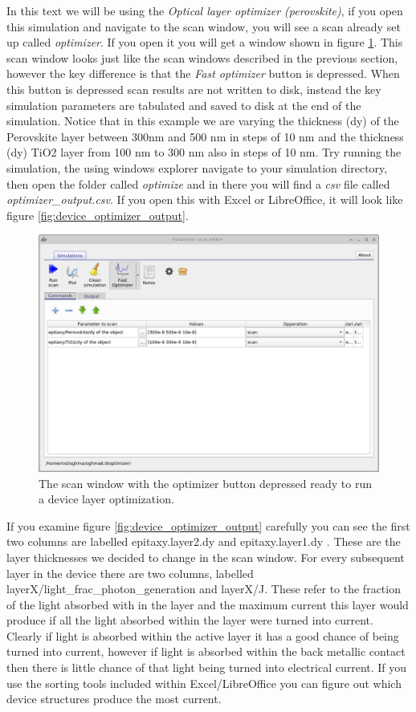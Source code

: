 In this text we will be using the \emph{Optical layer optimizer (perovskite)}, if you open this simulation and navigate to the scan window, you will see a scan already set up called \emph{optimizer}. If you open it you will get a window shown in figure \ref{fig:device_optimizer}. This scan window looks just like the scan windows described in the previous section, however the key difference is that the \emph{Fast optimizer} button is depressed. When this button is depressed scan results are not written to disk, instead the key simulation parameters are tabulated and saved to disk at the end of the simulation.  Notice that in this example we are varying the thickness (dy) of the Perovskite layer between 300nm and 500 nm in steps of 10 nm and the thickness (dy) TiO2 layer from 100 nm to 300 nm also in steps of 10 nm. Try running the simulation, the using windows explorer navigate to your simulation directory, then open the folder called \emph{optimize} and in there you will find a \emph{csv} file called \emph{optimizer\_output.csv}. If you open this with Excel or LibreOffice, it will look like figure \ref{fig:device_optimizer_output}.

\begin{figure}
\centering
\includegraphics[width=0.6\linewidth,height=0.5\linewidth]{./images/scan_optimizer.png}
\caption{The scan window with the optimizer button depressed ready to run a device layer optimization.}
\label{fig:device_optimizer}
\end{figure}

If you examine figure \ref{fig:device_optimizer_output} carefully you can see the first two columns are labelled epitaxy.layer2.dy and epitaxy.layer1.dy . These are the layer thicknesses we decided to change in the scan window.  For every subsequent layer in the device there are two columns, labelled layerX/light\_frac\_photon\_generation and layerX/J. These refer to the fraction of the light absorbed with in the layer and the maximum current this layer would produce if all the light absorbed within the layer were turned into current. Clearly if light is absorbed within the active layer it has a good chance of being turned into current, however if light is absorbed within the back metallic contact  then there is little chance of that light being turned into electrical current. If you use the sorting tools included within Excel/LibreOffice you can figure out which device structures produce the most current.

